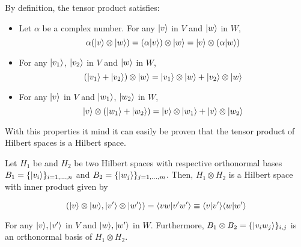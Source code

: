 By definition, the tensor product satisfies:

\begin{itemize}
	\item Let $\alpha$ be a complex number. For any $|v\rangle$ in $V$ and $|w\rangle$ in $W$,
	$$ \alpha(|v\rangle \otimes |w\rangle) = (\alpha|v\rangle) \otimes |w\rangle = |v\rangle \otimes (\alpha|w\rangle) $$
	
	\item For any $|v_1\rangle$, $|v_2\rangle$ in $V$ and $|w\rangle$ in $W$,
	$$ (|v_1\rangle + |v_2\rangle) \otimes |w\rangle = |v_1\rangle \otimes |w\rangle + |v_2\rangle \otimes |w\rangle $$
	
	\item For any $|v\rangle$ in $V$ and $|w_1\rangle$, $|w_2\rangle$ in $W$,
	$$ |v\rangle \otimes (|w_1\rangle + |w_2\rangle) = |v\rangle \otimes |w_1\rangle + |v\rangle \otimes |w_2\rangle $$
\end{itemize}

With this properties it mind it can easily be proven that the tensor product of Hilbert spaces is a Hilbert space.

\begin{proposition}
	Let $H_1$ be and $H_2$ be two Hilbert spaces with respective orthonormal bases $B_1 = \{|v_i\rangle\}_{i=1,\dots,n}$ and $B_2 = \{|w_j\rangle\}_{j=1,\dots,m}$. Then, $H_1 \otimes H_2$ is a Hilbert space with inner product given by
	
	$$ ( |v\rangle \otimes |w\rangle, |v'\rangle \otimes |w'\rangle) = \langle vw|v'w'\rangle \equiv \langle v|v'\rangle\langle w|w'\rangle $$
	
	For any $|v\rangle, |v'\rangle$ in $V$ and $|w\rangle, |w'\rangle$ in $W$. Furthermore, $B_1 \otimes B_2 = \{|v_i w_j\rangle\}_{i,j}$ is an orthonormal basis of $H_1 \otimes H_2$.
\end{proposition}

